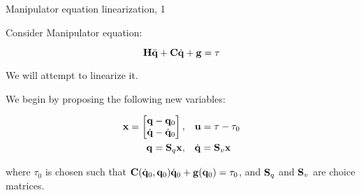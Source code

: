 \documentclass{beamer}
\begin{document}
\begin{frame}{Manipulator equation linearization, 1}
\begin{flushleft}

Consider Manipulator equation:

\begin{equation}
	\mathbf{H} \ddot{\mathbf{q}} + \mathbf{C} \dot{\mathbf{q}} + \mathbf{g} = \tau
\end{equation}

We will attempt to linearize it.

\bigskip

We begin by proposing the following new variables:

\begin{align}
	\mathbf{x} = 
	\begin{bmatrix}
		\mathbf{q} - \mathbf{q}_0 \\ 
		\dot{\mathbf{q}} - \dot{\mathbf{q}}_0
	\end{bmatrix},&  
\ \ \
	\mathbf{u} = \tau - \tau_0
	\\
	\mathbf{q} = \mathbf{S}_q \mathbf{x},&  
	\ \ \
	\dot{\mathbf{q}} = \mathbf{S}_v \mathbf{x}
\end{align}

where $\tau_0$ is chosen such that $\mathbf{C}(\dot{\mathbf{q}}_0, \mathbf{q}_0) \dot{\mathbf{q}}_0 + \mathbf{g}(\mathbf{q}_0) = \tau_0$, and $\mathbf{S}_q$ and $\mathbf{S}_v$ are choice matrices.


\end{flushleft}
\end{frame}
\end{document}
